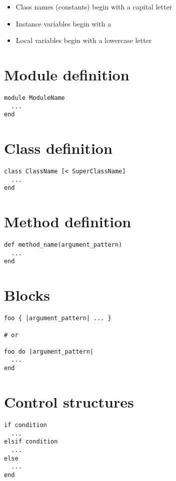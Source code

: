 \begin{itemize}
  \item Class names (constants) begin with a capital letter
  \item Instance variables begin with a 
  \item Local variables begin with a lowercase letter
\end{itemize}

\section*{Module definition}

\begin{lstlisting}
module ModuleName
  ...
end
\end{lstlisting}

\section*{Class definition}

\begin{lstlisting}
class ClassName [< SuperClassName]
  ...
end
\end{lstlisting}

\section*{Method definition}

\begin{lstlisting}
def method_name(argument_pattern)
  ...
end
\end{lstlisting}

\section*{Blocks}

\begin{lstlisting}
foo { |argument_pattern| ... }

# or

foo do |argument_pattern|
  ...
end
\end{lstlisting}

\section*{Control structures}

\begin{lstlisting}
if condition
  ...
elsif condition
  ...
else
  ...
end
\end{lstlisting}

